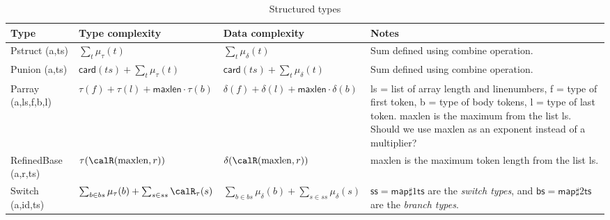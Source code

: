\begin{longtable}{||l|l|l|l|}
\caption[Structure types]{Structured types}
\label{tab:v2Structured}
\\\hline
\hline
Type & Type complexity & Data complexity & Notes \\\hline\hline

\footnotesize\textsf{Pstruct (a,ts)}\normalsize &
\footnotesize
$\sum_{t} \mu_\tau (t)$
\normalsize &
\footnotesize
$\sum_{t} \mu_\delta (t)$
\normalsize &
\parbox[t]{3cm}{
\footnotesize
Sum defined using \textsf{combine} operation.
\normalsize
\vspace{0.5mm}} \\\hline

\footnotesize\textsf{Punion (a,ts)}\normalsize &
\footnotesize
$\mathsf{card} (ts) + \sum_{t} \mu_\tau (t)$
\normalsize &
\footnotesize
$\mathsf{card} (ts) + \sum_{t} \mu_\delta (t)$
\normalsize &
\parbox[t]{3cm}{
\footnotesize
Sum defined using \textsf{combine} operation.
\normalsize
\vspace{0.5mm}} \\\hline

\footnotesize\textsf{Parray (a,ls,f,b,l)}\normalsize &
\footnotesize
$\tau (f) + \tau (l) + \mathsf{maxlen} \cdot \tau (b)$
\normalsize &
\footnotesize
$\delta (f) + \delta (l) + \mathsf{maxlen} \cdot \delta (b)$
\normalsize &
\parbox[t]{3cm}{
\footnotesize
\textsf{ls} = list of array length and linenumbers,
\textsf{f} = type of first token,
\textsf{b} = type of body tokens,
\textsf{l} = type of last token.
\textsf{maxlen} is the maximum from the list \textsf{ls}.
Should we use \textsf{maxlen} as an exponent instead of a multiplier?
\normalsize
\vspace{0.5mm}} \\\hline

\footnotesize\textsf{RefinedBase (a,r,ts) }\normalsize &
\footnotesize
$\tau (\calR (\mathrm{maxlen}, r))$
\normalsize &
\footnotesize
$\delta (\calR (\mathrm{maxlen}, r))$
\normalsize &
\parbox[t]{3cm}{
\footnotesize
\textsf{maxlen} is the maximum token length from the list \textsf{ls}.
\normalsize
\vspace{0.5mm}} \\\hline

\footnotesize\textsf{Switch (a,id,ts) }\normalsize &
\footnotesize
$\sum_{b \in bs} \mu_\tau (b) + \sum_{s \in ss} \calR_\tau (s)$
\normalsize &
\footnotesize
$\sum_{b \in bs} \mu_\delta (b) + \sum_{s \in ss} \mu_\delta (s)$
\normalsize &
\parbox[t]{3cm}{
\footnotesize
$\mathsf{ss} = \mathsf{map} \sharp 1 \mathsf{ts}$ are the
\textit{switch types}, and $\mathsf{bs} = \mathsf{map} \sharp 2 \textsf{ts}$
are the \textit{branch types}.
\normalsize
\vspace{0.5mm}} \\\hline


\end{longtable}
